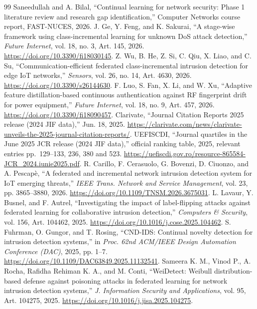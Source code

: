 \documentclass[10pt,a4paper]{article}
\begin{document}
\begin{thebibliography}{99}
 Saneedullah and A. Bilal, \enquote{Continual learning for network security: Phase 1 literature review and research gap identification,} Computer Networks course report, FAST-NUCES, 2026.
 J. Ge, Y. Feng, and K. Sakurai, \enquote{A stage-wise framework using class-incremental learning for unknown DoS attack detection,} \emph{Future Internet}, vol. 18, no. 3, Art. 145, 2026. \url{https://doi.org/10.3390/fi18030145}.
 Z. Wu, B. He, Z. Si, C. Qiu, X. Liao, and C. Su, \enquote{Communication-efficient federated class-incremental intrusion detection for edge IoT networks,} \emph{Sensors}, vol. 26, no. 14, Art. 4630, 2026. \url{https://doi.org/10.3390/s26144630}.
 F. Luo, S. Fan, X. Li, and W. Xu, \enquote{Adaptive feature distillation-based continuous authentication against RF fingerprint drift for power equipment,} \emph{Future Internet}, vol. 18, no. 9, Art. 457, 2026. \url{https://doi.org/10.3390/fi18090457}.
 Clarivate, \enquote{Journal Citation Reports 2025 release (2024 JIF data),} Jun. 18, 2025. \url{https://clarivate.com/news/clarivate-unveils-the-2025-journal-citation-reports/}.
 UEFISCDI, \enquote{Journal quartiles in the June 2025 JCR release (2024 JIF data),} official ranking table, 2025, relevant entries pp.~129--133, 236, 380 and 523. \url{https://uefiscdi.gov.ro/resource-865584-JCR_2024.iunie2025.pdf}.
 R. Carillo, F. Cerasuolo, G. Bovenzi, D. Ciuonzo, and A. Pescapè, \enquote{A federated and incremental network intrusion detection system for IoT emerging threats,} \emph{IEEE Trans. Network and Service Management}, vol. 23, pp. 3865--3880, 2026. \url{https://doi.org/10.1109/TNSM.2026.3675031}.
 L. Lavaur, Y. Busnel, and F. Autrel, \enquote{Investigating the impact of label-flipping attacks against federated learning for collaborative intrusion detection,} \emph{Computers \& Security}, vol. 156, Art. 104462, 2025. \url{https://doi.org/10.1016/j.cose.2025.104462}.
 S. Fuhrman, O. Gungor, and T. Rosing, \enquote{CND-IDS: Continual novelty detection for intrusion detection systems,} in \emph{Proc. 62nd ACM/IEEE Design Automation Conference (DAC)}, 2025, pp. 1--7. \url{https://doi.org/10.1109/DAC63849.2025.11132541}.
 Sameera K. M., Vinod P., A. Rocha, Rafidha Rehiman K. A., and M. Conti, \enquote{WeiDetect: Weibull distribution-based defense against poisoning attacks in federated learning for network intrusion detection systems,} \emph{J. Information Security and Applications}, vol. 95, Art. 104275, 2025. \url{https://doi.org/10.1016/j.jisa.2025.104275}.

\end{thebibliography}
\end{document}
